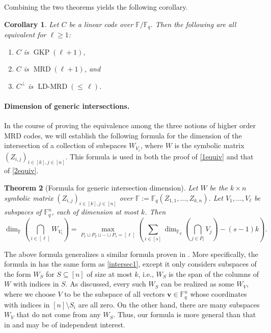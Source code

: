 \documentclass[11pt]{article}
\theoremstyle{plain}
\newtheorem{thm}{Theorem}[section]
\newtheorem{cor}[thm]{Corollary}
\theoremstyle{definition}
\theoremstyle{remark}
\newcommand{\ldmrd}[1]{\operatorname{LD-MRD}({\leq}\,#1)}
\newcommand{\F}{\mathbb{F}}
\newcommand{\bv}{\bm{v}}
\begin{document}
Combining the two theorems yields the following corollary.
\begin{cor}\label{cor:three_equiv}
Let $C$ be a linear code over $\F/\F_q$. 
Then the following are all equivalent for $\ell\geq 1$:
\begin{enumerate}
    \item $C$ is $\operatorname{GKP}(\ell+1)$,
    \item $C$ is $\operatorname{MRD}(\ell+1)$, and
    \item $C^{\perp}$ is $\ldmrd{\ell}$.
\end{enumerate}
\end{cor}

\paragraph{Dimension of generic intersections.} 

In the course of proving the equivalence among the three notions of higher order MRD codes, we will establish the following formula for the dimension of the intersection of a collection of subspaces $W_{V_i}$, where $W$ is the symbolic matrix $(Z_{i,j})_{i\in [k], j\in [n]}$. This formula is used in both the proof of \cref{1equiv} and that of \cref{2equiv}.

\begin{thm}[Formula for generic intersection dimension]\label{gintersec}
Let $W$ be the $k\times n$ symbolic matrix $(Z_{i,j})_{i\in [k], j\in [n]}$ over $\F:=\F_q(Z_{1,1},\dots,Z_{k,n})$.
Let $V_1,\dots,V_\ell$ be subspaces of $\F_q^n$, each of dimension at most $k$. Then
\[
\dim_{\mathbb{F}}\left(\bigcap_{i\in[\ell]}W_{V_i}\right)=\max_{P_1\sqcup P_2\sqcup \cdots\sqcup P_s=[\ell]}\left(\sum_{i\in[s]}\dim_{\F_q}\left(\bigcap_{j\in P_i}V_j\right)-(s-1)k\right).
\]
\end{thm}

The above formula generalizes a similar formula proven in \cite{brakensiek2023generic}. More specifically, the formula in \cite{brakensiek2023generic} has the same form as \eqref{intersec1}, except it only considers subspaces of the form $W_S$ for $S\subseteq [n]$ of size at most $k$, i.e., $W_S$ is the span of the columns of $W$ with indices in $S$. As discussed, every such $W_S$ can be realized as some $W_V$, where we choose $V$ to be the subspace of all vectors $\bv\in\F_q^n$ whose coordinates with indices in $[n]\setminus S_i$ are all zero. On the other hand, there are many subspaces $W_V$ that do not come from any $W_S$. Thus, our formula is more general than that in \cite{brakensiek2023generic} and may be of independent interest.
\end{document}
